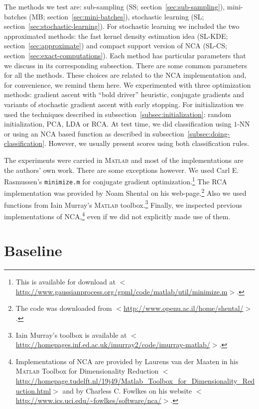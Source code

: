 The methods we test are: sub-sampling (SS; section~\ref{sec:sub-sampling}), mini-batches (MB; section~\ref{sec:mini-batches}), stochastic learning (SL; section~\ref{sec:stochastic-learning}). For stochastic learning we included the two approximated methods: the fast kernel density estimation idea (SL-KDE; section~\ref{sec:approximate}) and compact support version of NCA (SL-CS; section~\ref{sec:exact-computations}). Each method has particular parameters that we discuss in its corresponding subsection. There are some common parameters for all the methods. These choices are related to the NCA implementation and, for convenience, we remind them here. We experimented with three optimization methods: gradient ascent with ``bold driver'' heuristic, conjugate gradients and variants of stochastic gradient ascent with early stopping. For initialization we used the techniques described in subsection~\ref{subsec:initialization}: random initialization, PCA, LDA or RCA. At test time, we did classification using $1$-NN or using an NCA based function as described in subsection~\ref{subsec:doing-classification}. However, we usually present scores using both classification rules.

The experiments were carried in \textsc{Matlab} and most of the implementations are the authors' own work. There are some exceptions however. We used Carl E. Rasmussen's \texttt{minimize.m} for conjugate gradient optimization.\footnote{This is available for download at $<$\url{http://www.gaussianprocess.org/gpml/code/matlab/util/minimize.m}$>$.}
 The RCA implementation was provided by Noam Shental on his web-page.\footnote{The code was downloaded from $<$\url{http://www.openu.ac.il/home/shental/}$>$.}
 Also we used functions from Iain Murray's \textsc{Matlab} toolbox.\footnote{Iain Murray's toolbox is available at $<$\url{http://homepages.inf.ed.ac.uk/imurray2/code/imurray-matlab/}$>$.} Finally, we inspected previous implementations of NCA,\footnote{Implementations of NCA are provided by Laurens van der Maaten in his \textsc{Matlab} Toolbox for Dimensionality Reduction $<$\url{http://homepage.tudelft.nl/19j49/Matlab_Toolbox_for_Dimensionality_Reduction.html}$>$ and by Charless C. Fowlkes on his website $<$\url{http://www.ics.uci.edu/~fowlkes/software/nca/}$>$.}
 even if we did not explicitly made use of them.

\section{Baseline}
\label{sec:baseline} 

